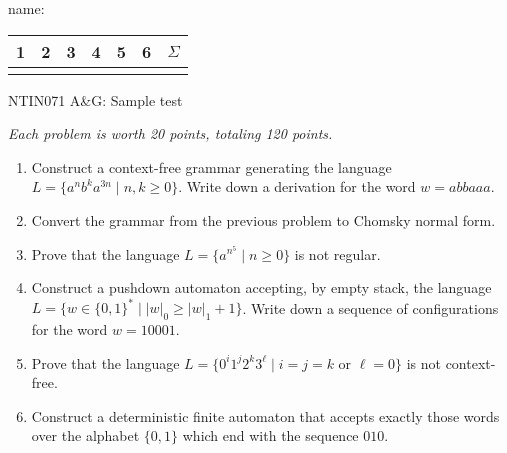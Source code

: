 \documentclass[a4paper,12pt]{article}
\begin{document}
\thispagestyle{empty}

{\Large\sc name:}
\hfill
\begin{tabular}{c|c|c|c|c|c||c}
    1 & 2 & 3 & 4 & 5 & 6 & $\Sigma$\\ \hline
      &   &   &   &   &   &
\end{tabular}

\bigskip

\begin{center}
    \large{NTIN071 A\&G: Sample test}
\end{center}
    
{\it Each problem is worth 20 points, totaling 120 points.}
    
    \bigskip
    
\begin{enumerate}
    \item Construct a context-free grammar generating the language $L=\{a^nb^ka^{3n}\mid n,k\geq 0\}$. Write down a derivation for the word $w=abbaaa$.
    \item Convert the grammar from the previous problem to Chomsky normal form.
    \item Prove that the language $L=\{a^{n^5}\mid n\geq 0\}$ is not regular.
    \item Construct a pushdown automaton accepting, by empty stack, the language $L=\{w\in\{0,1\}^*\mid |w|_0\geq |w|_1 + 1\}$. Write down a sequence of configurations for the word $w=10001$.
    \item Prove that the language $L=\{0^i1^j2^k3^\ell\mid i=j=k\text{ or }\ell=0\}$ is not context-free.
    \item Construct a deterministic finite automaton that accepts exactly those words over the alphabet $\{0,1\}$ which end with the sequence $010$.
\end{enumerate}
\end{document}
